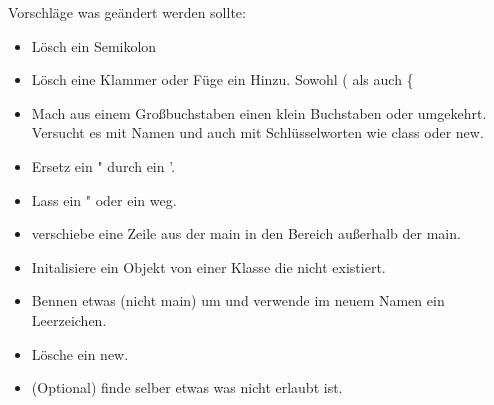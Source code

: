\begin{enumerate}
    Vorschläge was geändert werden sollte:
    \begin{itemize}
        \item Lösch ein Semikolon
        \item Lösch eine Klammer oder Füge ein Hinzu. Sowohl ( als auch \{
        \item Mach aus einem Großbuchstaben einen klein Buchstaben oder umgekehrt. Versucht es mit Namen und auch mit Schlüsselworten wie class oder new.
        \item Ersetz ein " durch ein '.
        \item Lass ein " oder ein weg.
        \item verschiebe eine Zeile aus der main in den Bereich außerhalb der main.
        \item Initalisiere ein Objekt von einer Klasse die nicht existiert.
        \item Bennen etwas (nicht main) um und verwende im neuem Namen ein Leerzeichen.
        \item Lösche ein new.
        \item (Optional) finde selber etwas was nicht erlaubt ist.
    \end{itemize}
\end{enumerate}
